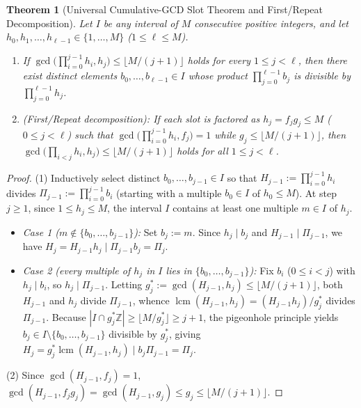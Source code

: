 \documentclass[11pt]{article}
\newtheorem{theorem}{Theorem}
\DeclareMathOperator{\lcm}{lcm}
\begin{document}
\begin{theorem}[Universal Cumulative-GCD Slot Theorem and First/Repeat Decomposition]
\label{thm:cumgcd}
Let $I$ be any interval of $M$ consecutive positive integers, and let $h_0, h_1, \dots, h_{\ell - 1} \in \{1, \dots, M\}$ ($1 \le \ell \le M$).
\begin{enumerate}
\item If $\gcd\bigl(\prod_{i = 0}^{j - 1} h_i, h_j\bigr) \le \lfloor M / (j + 1) \rfloor$ holds for every $1 \le j < \ell$, then there exist distinct elements $b_0, \dots, b_{\ell - 1} \in I$ whose product $\prod_{j = 0}^{\ell - 1} b_j$ is divisible by $\prod_{j = 0}^{\ell - 1} h_j$.
\item \emph{(First/Repeat decomposition):} If each slot is factored as $h_j = f_j g_j \le M$ ($0 \le j < \ell$) such that $\gcd\bigl(\prod_{i = 0}^{j - 1} h_i, f_j\bigr) = 1$ while $g_j \le \lfloor M / (j + 1) \rfloor$, then $\gcd\bigl(\prod_{i < j} h_i, h_j\bigr) \le \lfloor M / (j + 1) \rfloor$ holds for all $1 \le j < \ell$.
\end{enumerate}
\end{theorem}
\begin{proof}
(1) Inductively select distinct $b_0, \dots, b_{j - 1} \in I$ so that $H_{j - 1} := \prod_{i = 0}^{j - 1} h_i$ divides $\Pi_{j - 1} := \prod_{i = 0}^{j - 1} b_i$ (starting with a multiple $b_0 \in I$ of $h_0 \le M$). At step $j \ge 1$, since $1 \le h_j \le M$, the interval $I$ contains at least one multiple $m \in I$ of $h_j$.
\begin{itemize}
\item \emph{Case 1 ($m \notin \{b_0, \dots, b_{j - 1}\}$):} Set $b_j := m$. Since $h_j \mid b_j$ and $H_{j - 1} \mid \Pi_{j - 1}$, we have $H_j = H_{j - 1} h_j \mid \Pi_{j - 1} b_j = \Pi_j$.
\item \emph{Case 2 (every multiple of $h_j$ in $I$ lies in $\{b_0, \dots, b_{j - 1}\}$):} Fix $b_i$ ($0 \le i < j$) with $h_j \mid b_i$, so $h_j \mid \Pi_{j - 1}$. Letting $g_j^* := \gcd(H_{j - 1}, h_j) \le \lfloor M / (j + 1) \rfloor$, both $H_{j - 1}$ and $h_j$ divide $\Pi_{j - 1}$, whence $\lcm(H_{j - 1}, h_j) = (H_{j - 1} h_j) / g_j^*$ divides $\Pi_{j - 1}$. Because $|I \cap g_j^* \mathbb{Z}| \ge \lfloor M / g_j^* \rfloor \ge j + 1$, the pigeonhole principle yields $b_j \in I \setminus \{b_0, \dots, b_{j - 1}\}$ divisible by $g_j^*$, giving $H_j = g_j^* \lcm(H_{j - 1}, h_j) \mid b_j \Pi_{j - 1} = \Pi_j$.
\end{itemize}

(2) Since $\gcd(H_{j - 1}, f_j) = 1$, $\gcd(H_{j - 1}, f_j g_j) = \gcd(H_{j - 1}, g_j) \le g_j \le \lfloor M / (j + 1) \rfloor$.
\end{proof}
\end{document}
